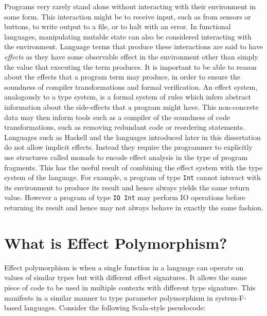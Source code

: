 \documentclass{Report}
\begin{document}
Programs very rarely stand alone without interacting with their environment in some form. This interaction might be to receive input, such as from sensors or buttons, to write output to a file, or to halt with an error. In functional languages, manipulating mutable state can also be considered interacting with the environment. Language terms that produce these interactions are said to have \textit{effects} as they have some observable effect in the environment other than simply the value that executing the term produces. It is important to be able to reason about the effects that a program term may produce, in order to ensure the soundness of compiler transformations and formal verification. An effect system, analogously to a type system, is a formal system of rules which infers abstract information about the side-effects that a program might have. This non-concrete data may then inform tools such as a compiler of the soundness of code transformations, such as removing redundant code or reordering statements. Languages such as Haskell and the languages introduced later in this dissertation do not allow implicit effects. Instead they require the programmer to explicitly use structures called monads  to encode effect analysis in the type of program fragments. This has the useful result of combining the effect system with the type system of the language. For example, a program of type \texttt{Int} cannot interact with its environment to produce its result and hence always yields the same return value. However a program of type \texttt{IO Int} may perform IO operations before returning its result and hence may not always behave in exactly the same fashion.

\section{What is Effect Polymorphism?}


Effect polymorphism is when a single function in a language can operate on values of similar types but with different effect signatures. It allows the same piece of code to be used in multiple contexts with different type signature. This manifests in a similar manner to type parameter polymorphism in system-F-based languages. Consider the following Scala-style pseudocode:
\end{document}
